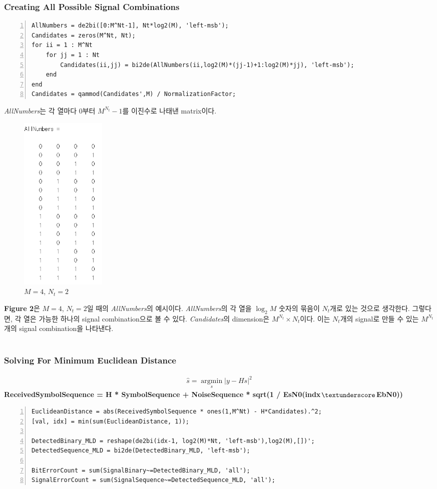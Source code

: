 \documentclass{article}
\newcommand{\bd}{\textbf} %
\providecommand{\abs}[1]{\lvert#1\rvert}
\begin{document}
\subsubsection{Creating All Possible Signal Combinations}
\begin{lstlisting}[style=Matlab-editor, frame=single, numbers=left,]
% Creating Matrix for all possible combinations of signals (M^Nt possible combinations)
AllNumbers = de2bi([0:M^Nt-1], Nt*log2(M), 'left-msb');
Candidates = zeros(M^Nt, Nt);
for ii = 1 : M^Nt
    for jj = 1 : Nt
        Candidates(ii,jj) = bi2de(AllNumbers(ii,log2(M)*(jj-1)+1:log2(M)*jj), 'left-msb');
    end
end
Candidates = qammod(Candidates',M) / NormalizationFactor;
\end{lstlisting}
\textsl{AllNumbers}는 각 열마다 0부터 $M^{N_t}-1$를 이진수로 나태낸 matrix이다.
\begin{figure}[H]
	\centerline{\includegraphics[width=0.2\textwidth]{AllNumbers.png}}
	\caption{$M=4$, $N_t=2$}
\end{figure}
\bd{Figure 2}은 $M=4$, $N_t=2$일 때의 \textsl{AllNumbers}의 예시이다. \textsl{AllNumbers}의 각 열을 $\log_{2}M$ 숫자의 묶음이 $N_t$개로 있는 것으로 생각한다. 그렇다면, 각 열은 가능한 하나의 signal combination으로 볼 수 있다. \textsl{Candidates}의 dimension은 $M^{N_t}\times N_t$이다. 이는 $N_t$개의 signal로 만들 수 있는 $M^{N_t}$개의 signal combination을 나타낸다.\\
\\
\subsubsection{Solving For Minimum Euclidean Distance}
\begin{gather}
\hat{s}=\operatorname*{argmin}_s \abs{y-Hs}^2
\end{gather}
\bd{ReceivedSymbolSequence = H * SymbolSequence + NoiseSequence * sqrt(1 / EsN0(indx$\textunderscore$EbN0))}
\begin{lstlisting}[style=Matlab-editor, frame=single, numbers=left,]
% results in Nt x M^Nt, each column representing each candidate symbol combination
EuclideanDistance = abs(ReceivedSymbolSequence * ones(1,M^Nt) - H*Candidates).^2;
[val, idx] = min(sum(EuclideanDistance, 1));

DetectedBinary_MLD = reshape(de2bi(idx-1, log2(M)*Nt, 'left-msb'),log2(M),[])';
DetectedSequence_MLD = bi2de(DetectedBinary_MLD, 'left-msb');

BitErrorCount = sum(SignalBinary~=DetectedBinary_MLD, 'all');
SignalErrorCount = sum(SignalSequence~=DetectedSequence_MLD, 'all');
\end{lstlisting}
\end{document}
